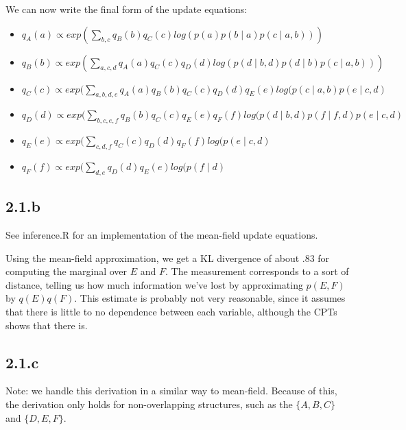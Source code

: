 \documentclass{article}
\begin{document}
We can now write the final form of the update equations:
\begin{itemize}
  \item $q_{A}(a) \propto exp(\sum_{b,c} q_{B}(b) q_{C}(c) log( p(a)p(b \mid a)p(c \mid a,b)))$
  \item $q_{B}(b) \propto exp(\sum_{a,c,d} q_{A}(a) q_{C}(c) q_{D}(d) log(p(d \mid b,d) p(d \mid b) p(c \mid a,b)))$
  \item $q_{C}(c) \propto exp(\sum_{a,b,d,e} q_{A}(a) q_{B}(b) q_{C}(c) q_{D}(d) q_{E}(e) log(p(c \mid a,b) p(e \mid c,d)$
  \item $q_{D}(d) \propto exp(\sum_{b,c,e,f} q_{B}(b) q_{C}(c) q_{E}(e) q_{F}(f) log(p(d \mid b,d) p(f \mid f,d) p(e \mid c,d)$
  \item $q_{E}(e) \propto exp(\sum_{c,d,f} q_{C}(c) q_{D}(d) q_{F}(f) log(p(e \mid c,d)$
  \item $q_{F}(f) \propto exp(\sum_{d,e} q_{D}(d) q_{E}(e) log(p(f \mid d)$
\end{itemize}


\subsection*{2.1.b}
See inference.R for an implementation of the mean-field update equations.

Using the mean-field approximation, we get a KL divergence of about .83 for computing the marginal over $E$ and $F$. The measurement corresponds to a sort of distance, telling us how much information we've lost by approximating $p(E,F)$ by $q(E)q(F)$. This estimate is probably not very reasonable, since it assumes that there is little to no dependence between each variable, although the CPTs shows that there is.

\subsection*{2.1.c}
Note: we handle this derivation in a similar way to mean-field. Because of this, the derivation only holds for non-overlapping structures, such as the $\{A,B,C\}$ and $\{D,E,F\}$.
\end{document}
